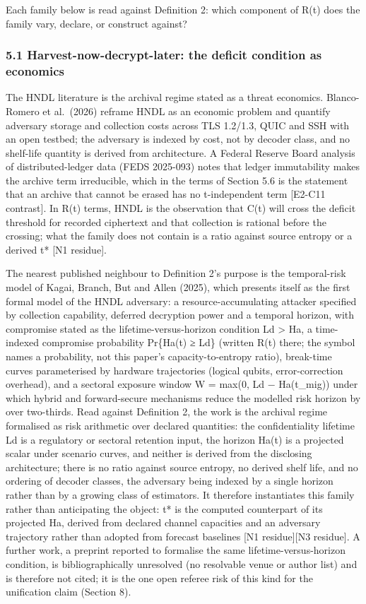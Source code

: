 \documentclass[
  11pt,
]{article}
\begin{document}
Each family below is read against Definition 2: which component of R(t)
does the family vary, declare, or construct against?

\subsubsection{5.1 Harvest-now-decrypt-later: the deficit condition as
economics}\label{harvest-now-decrypt-later-the-deficit-condition-as-economics}

The HNDL literature is the archival regime stated as a threat economics.
Blanco-Romero et al.~(2026) reframe HNDL as an economic problem and
quantify adversary storage and collection costs across TLS 1.2/1.3, QUIC
and SSH with an open testbed; the adversary is indexed by cost, not by
decoder class, and no shelf-life quantity is derived from architecture.
A Federal Reserve Board analysis of distributed-ledger data (FEDS
2025-093) notes that ledger immutability makes the archive term
irreducible, which in the terms of Section 5.6 is the statement that an
archive that cannot be erased has no t-independent term {[}E2-C11
contrast{]}. In R(t) terms, HNDL is the observation that C(t) will cross
the deficit threshold for recorded ciphertext and that collection is
rational before the crossing; what the family does not contain is a
ratio against source entropy or a derived t* {[}N1 residue{]}.

The nearest published neighbour to Definition 2's purpose is the
temporal-risk model of Kagai, Branch, But and Allen (2025), which
presents itself as the first formal model of the HNDL adversary: a
resource-accumulating attacker specified by collection capability,
deferred decryption power and a temporal horizon, with compromise stated
as the lifetime-versus-horizon condition Ld \textgreater{} Ha, a
time-indexed compromise probability Pr\{Ha(t) ≥ Ld\} (written R(t)
there; the symbol names a probability, not this paper's
capacity-to-entropy ratio), break-time curves parameterised by hardware
trajectories (logical qubits, error-correction overhead), and a sectoral
exposure window W = max(0, Ld − Ha(t\_mig)) under which hybrid and
forward-secure mechanisms reduce the modelled risk horizon by over
two-thirds. Read against Definition 2, the work is the archival regime
formalised as risk arithmetic over declared quantities: the
confidentiality lifetime Ld is a regulatory or sectoral retention input,
the horizon Ha(t) is a projected scalar under scenario curves, and
neither is derived from the disclosing architecture; there is no ratio
against source entropy, no derived shelf life, and no ordering of
decoder classes, the adversary being indexed by a single horizon rather
than by a growing class of estimators. It therefore instantiates this
family rather than anticipating the object: t* is the computed
counterpart of its projected Ha, derived from declared channel
capacities and an adversary trajectory rather than adopted from forecast
baselines {[}N1 residue{]}{[}N3 residue{]}. A further work, a preprint
reported to formalise the same lifetime-versus-horizon condition, is
bibliographically unresolved (no resolvable venue or author list) and is
therefore not cited; it is the one open referee risk of this kind for
the unification claim (Section 8).
\end{document}
